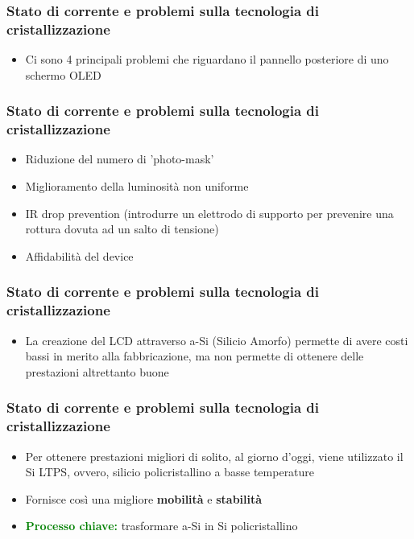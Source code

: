 \documentclass[12pt]{beamer}
\begin{document}
	\begin{frame}
		\frametitle{Stato di corrente e problemi sulla tecnologia di cristallizzazione}
		\begin{itemize}
			\item Ci sono 4 principali problemi che riguardano il pannello posteriore di uno schermo OLED
		\end{itemize}
	\end{frame}
	\begin{frame}
		\frametitle{Stato di corrente e problemi sulla tecnologia di cristallizzazione}
		\begin{itemize}
			\item Riduzione del numero di 'photo-mask'
			\pause
			\item Miglioramento della luminosità non uniforme
			\pause
			\item IR drop prevention (introdurre un elettrodo di supporto per prevenire una rottura dovuta ad un salto di tensione)
			\pause
			\item Affidabilità del device
		\end{itemize}
	\end{frame}
	\begin{frame}
		\frametitle{Stato di corrente e problemi sulla tecnologia di cristallizzazione}
		\begin{itemize}
			\item La creazione del LCD attraverso a-Si (Silicio Amorfo) permette di avere costi bassi in merito alla fabbricazione, ma non permette di ottenere delle prestazioni altrettanto buone
		\end{itemize}
	\end{frame}
	\begin{frame}
		\frametitle{Stato di corrente e problemi sulla tecnologia di cristallizzazione}
		\begin{itemize}
			\item Per ottenere prestazioni migliori di solito, al giorno d'oggi, viene utilizzato il Si LTPS, ovvero, silicio policristallino a basse temperature
			\pause
			\item Fornisce così una migliore \textbf{mobilità} e \textbf{stabilità}
			\pause
			\item \textbf{\textcolor{green}{Processo chiave:}} trasformare a-Si in Si policristallino
		\end{itemize}
	\end{frame}
\end{document}
